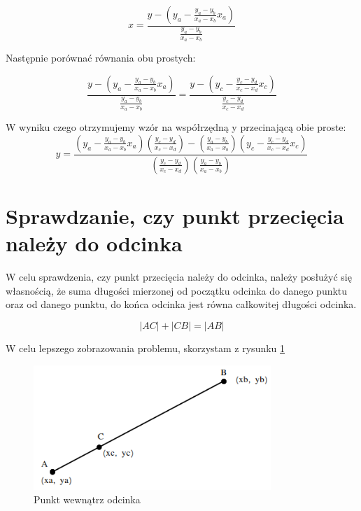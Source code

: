 \begin{equation}
x=\frac{y - (y_a - \frac{y_a - y_b}{x_a - x_b}x_a)}{\frac{y_a - y_b}{x_a - x_b}}
\end{equation}

Następnie porównać równania obu prostych:

\begin{equation}
\frac{y - (y_a - \frac{y_a - y_b}{x_a - x_b}x_a)}{\frac{y_a - y_b}{x_a - x_b}}=\frac{y - (y_c - \frac{y_c - y_d}{x_c - x_d}x_c)}{\frac{y_c - y_d}{x_c - x_d}}
\end{equation}

W wyniku czego otrzymujemy wzór na współrzędną y przecinającą obie proste:
\begin{equation}
y = \frac{(y_a - \frac{y_a - y_b}{x_a - x_b}x_a)(\frac{y_c - y_d}{x_c - x_d}) - (\frac{y_a - y_b}{x_a - x_b})(y_c - \frac{y_c - y_d}{x_c - x_d}x_c)}
{(\frac{y_c - y_d}{x_c - x_d})(\frac{y_a - y_b}{x_a - x_b})}
\end{equation}

\newpage
\section{Sprawdzanie, czy punkt przecięcia należy do odcinka}
\label{sec:SprawdzanieCzyPunktPrzecięciaNależyDoOdcinka}

W celu sprawdzenia, czy punkt przecięcia należy do odcinka, należy posłużyć się własnością, że suma długości mierzonej od początku odcinka do danego punktu oraz od danego punktu, do końca odcinka jest równa całkowitej długości odcinka.

\begin{equation} \label{eq:pointInSegment}
|AC| + |CB| = |AB|
\end{equation}

W celu lepszego zobrazowania problemu, skorzystam z rysunku \ref{sec:pointSegment}

\begin{figure}[h]
\caption{Punkt wewnątrz odcinka}
\label{sec:pointSegment}
\centering
\includegraphics[width=0.8\textwidth]{pointInSegment}
\end{figure}

